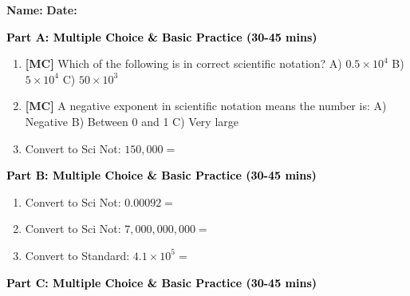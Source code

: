 \documentclass[12pt, letterpaper, fleqn]{article}
\newcommand{\blank}{\underline{\hspace{2.2cm}}}
\begin{document}
\textbf{Name:} \underline{\hspace{5cm}}
\hfill
\textbf{Date:} \underline{\hspace{3cm}}\\


\begin{tcolorbox}[colback=customteal!20]
\large\textcolor{black}{\textbf{Part A: Multiple Choice \& Basic Practice (30-45 mins)}}
\end{tcolorbox}

\vspace{3mm}

\begin{enumerate}[itemsep=2.5cm, leftmargin=0.6cm]
\item \textbf{[MC]} Which of the following is in correct scientific notation?
A) $0.5 \times 10^4$ \quad B) $5 \times 10^4$ \quad C) $50 \times 10^3$
\item \textbf{[MC]} A negative exponent in scientific notation means the number is:
A) Negative B) Between 0 and 1 C) Very large
\item Convert to Sci Not: $150,000 =$ \blank
\end{enumerate}

\newpage

\begin{tcolorbox}[colback=customteal!20]
\large\textcolor{black}{\textbf{Part B: Multiple Choice \& Basic Practice (30-45 mins)}}
\end{tcolorbox}

\vspace{3mm}

\begin{enumerate}[itemsep=2.5cm, leftmargin=0.6cm, resume]
\item Convert to Sci Not: $0.00092 =$ \blank
\item Convert to Sci Not: $7,000,000,000 =$ \blank
\item Convert to Standard: $4.1 \times 10^5 =$ \blank
\end{enumerate}

\newpage

\begin{tcolorbox}[colback=customteal!20]
\large\textcolor{black}{\textbf{Part C: Multiple Choice \& Basic Practice (30-45 mins)}}
\end{tcolorbox}

\vspace{3mm}
\end{document}
